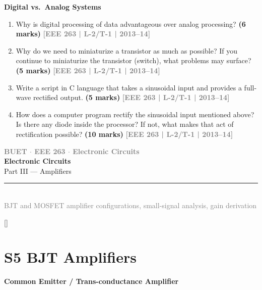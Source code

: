 \documentclass[12pt,a3paper]{article}
\newcommand{\yr}[1]{\hfill\textcolor{gray}{\small\textbf{[#1]}}}
\newcommand{\mk}[1]{\textcolor{orange!70!black}{\small\textbf{(#1 marks)}}}
\newcommand{\subtopic}[2]{%
  \vspace{10pt}
  \noindent\begin{tcolorbox}[colback=#1!8,colframe=#1,boxrule=0.6pt,arc=4pt,
    left=6pt,right=6pt,top=4pt,bottom=4pt]
    \small\bfseries\textcolor{#1}{#2}
  \end{tcolorbox}
  \vspace{2pt}
}
\newcommand{\secdivider}[3]{%
  \newpage\thispagestyle{empty}%
  \vspace*{\fill}%
  \begin{tcolorbox}[enhanced,colback=#3!6,colframe=#3,boxrule=1.5pt,arc=8pt,
    left=20pt,right=20pt,top=22pt,bottom=22pt,
    shadow={3pt}{-3pt}{0pt}{black!15}]
    \centering
    {\large\textcolor{gray}{\textbf{BUET $\cdot$ EEE 263 $\cdot$ Electronic Circuits}}}\\[8pt]
    {\fontsize{26}{32}\selectfont\bfseries\textcolor{#3}{Electronic Circuits}}\\[6pt]
    {\fontsize{15}{19}\selectfont\textcolor{dgray}{#1}}\\[12pt]
    \textcolor{#3!60}{\rule{0.5\textwidth}{0.5pt}}\\[6pt]
    {\small\textcolor{gray}{#2}}
  \end{tcolorbox}%
  \vspace*{\fill}\newpage%
}
\begin{document}
\subtopic{cB}{Digital vs.\ Analog Systems}
\label{sub:s4-digital}

\begin{enumerate}\item Why is digital processing of data advantageous over analog processing?
\mk{6} \yr{EEE 263 | L-2/T-1 | 2013--14}

\item Why do we need to miniaturize a transistor as much as possible? If you continue to miniaturize the transistor (switch), what problems may surface?
\mk{5} \yr{EEE 263 | L-2/T-1 | 2013--14}

\item Write a script in C language that takes a sinusoidal input and provides a full-wave rectified output.
\mk{5} \yr{EEE 263 | L-2/T-1 | 2013--14}

\item How does a computer program rectify the sinusoidal input mentioned above? Is there any diode inside the processor? If not, what makes that act of rectification possible?
\mk{10} \yr{EEE 263 | L-2/T-1 | 2013--14}

\end{enumerate}


\secdivider{Part III --- Amplifiers}{BJT and MOSFET amplifier configurations, small-signal analysis, gain derivation}{cC}

\label{sec:S5}
\titleformat{\section}{\large\bfseries\color{cC}}{}{0em}{}[\titlerule]
\section*{S5 \quad BJT Amplifiers}

\subtopic{cC}{Common Emitter / Trans-conductance Amplifier}
\label{sub:s5-ce}
\end{document}
